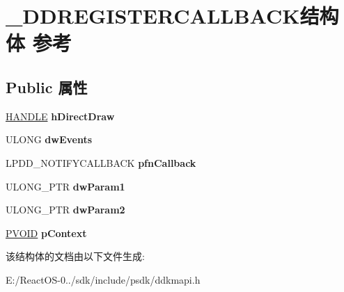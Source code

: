 \hypertarget{struct___d_d_r_e_g_i_s_t_e_r_c_a_l_l_b_a_c_k}{}\section{\+\_\+\+D\+D\+R\+E\+G\+I\+S\+T\+E\+R\+C\+A\+L\+L\+B\+A\+C\+K结构体 参考}
\label{struct___d_d_r_e_g_i_s_t_e_r_c_a_l_l_b_a_c_k}
\subsection*{Public 属性}
\begin{DoxyCompactItemize}
\item 
\mbox{\label{struct___d_d_r_e_g_i_s_t_e_r_c_a_l_l_b_a_c_k_a25cdf7f0f56256d5cc80c01e5f963327}} 
\hyperlink{interfacevoid}{H\+A\+N\+D\+LE} {\bfseries h\+Direct\+Draw}
\item 
\mbox{\label{struct___d_d_r_e_g_i_s_t_e_r_c_a_l_l_b_a_c_k_ab85699ba3024002fcdbfb8f02b95879c}} 
U\+L\+O\+NG {\bfseries dw\+Events}
\item 
\mbox{\label{struct___d_d_r_e_g_i_s_t_e_r_c_a_l_l_b_a_c_k_a185dc82f54ed11e314eeb00b60958eb6}} 
L\+P\+D\+D\+\_\+\+N\+O\+T\+I\+F\+Y\+C\+A\+L\+L\+B\+A\+CK {\bfseries pfn\+Callback}
\item 
\mbox{\label{struct___d_d_r_e_g_i_s_t_e_r_c_a_l_l_b_a_c_k_a004daeb359c112f0e976fe22b6f6e130}} 
U\+L\+O\+N\+G\+\_\+\+P\+TR {\bfseries dw\+Param1}
\item 
\mbox{\label{struct___d_d_r_e_g_i_s_t_e_r_c_a_l_l_b_a_c_k_a4da6459cb9ed1314d3cace5876f1cd2e}} 
U\+L\+O\+N\+G\+\_\+\+P\+TR {\bfseries dw\+Param2}
\item 
\mbox{\label{struct___d_d_r_e_g_i_s_t_e_r_c_a_l_l_b_a_c_k_ab62dde133e4056b6d843dd850250378a}} 
\hyperlink{interfacevoid}{P\+V\+O\+ID} {\bfseries p\+Context}
\end{DoxyCompactItemize}


该结构体的文档由以下文件生成\+:\begin{DoxyCompactItemize}
\item 
E\+:/\+React\+O\+S-\/0../sdk/include/psdk/ddkmapi.\+h\end{DoxyCompactItemize}
